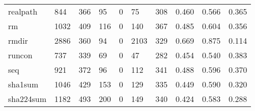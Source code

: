 \begin{longtable}{lp{1.3cm}p{1.3cm}p{1.3cm}p{1.3cm}p{1.3cm}p{1.3cm}p{1.3cm}p{1.3cm}p{1.3cm}}
realpath  &                    844 &                                366 &                                95 &                                0 &                                75 &                             308 &                                0.460 &                                  0.566 &                                0.365 \\
rm        &                   1032 &                                409 &                               116 &                                0 &                               140 &                             367 &                                0.485 &                                  0.604 &                                0.356 \\
rmdir     &                   2886 &                                360 &                                94 &                                0 &                              2103 &                             329 &                                0.669 &                                  0.875 &                                0.114 \\
runcon    &                    737 &                                339 &                                69 &                                0 &                                47 &                             282 &                                0.454 &                                  0.540 &                                0.383 \\
seq       &                    921 &                                372 &                                96 &                                0 &                               112 &                             341 &                                0.488 &                                  0.596 &                                0.370 \\
sha1sum   &                   1046 &                                429 &                               153 &                                0 &                               129 &                             335 &                                0.449 &                                  0.590 &                                0.320 \\
sha224sum &                   1182 &                                493 &                               200 &                                0 &                               149 &                             340 &                                0.424 &                                  0.583 &                                0.288 \\

\end{longtable}
